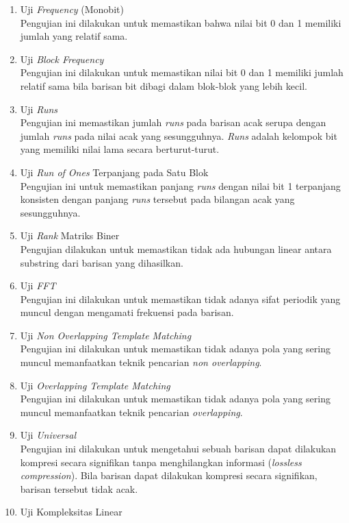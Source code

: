 \begin{enumerate}
  \item Uji \emph{Frequency} (Monobit) \\
  Pengujian ini dilakukan untuk memastikan bahwa nilai bit 0 dan 1 memiliki jumlah yang relatif sama.
  \item Uji \emph{Block Frequency} \\
  Pengujian ini dilakukan untuk memastikan nilai bit 0 dan 1 memiliki jumlah relatif sama bila barisan bit dibagi dalam blok-blok yang lebih kecil.
  \item Uji \emph{Runs} \\
  Pengujian ini memastikan jumlah \emph{runs} pada barisan acak serupa dengan jumlah \emph{runs} pada nilai acak yang sesungguhnya. \emph{Runs} adalah kelompok bit yang memiliki nilai lama secara berturut-turut.
  \item Uji \emph{Run of Ones} Terpanjang pada Satu Blok \\
  Pengujian ini untuk memastikan panjang \emph{runs} dengan nilai bit 1 terpanjang konsisten dengan panjang \emph{runs} tersebut pada bilangan acak yang sesungguhnya.
  \item Uji \emph{Rank} Matriks Biner \\
  Pengujian dilakukan untuk memastikan tidak ada hubungan linear antara substring dari barisan yang dihasilkan.
  \item Uji \emph{FFT} \\
  Pengujian ini dilakukan untuk memastikan tidak adanya sifat periodik yang muncul dengan mengamati frekuensi pada barisan.
  \item Uji \emph{Non Overlapping Template Matching} \\
  Pengujian ini dilakukan untuk memastikan tidak adanya pola yang sering muncul memanfaatkan teknik pencarian \emph{non overlapping}.
  \item Uji \emph{Overlapping Template Matching} \\
  Pengujian ini dilakukan untuk memastikan tidak adanya pola yang sering muncul memanfaatkan teknik pencarian \emph{overlapping}.
  \item Uji \emph{Universal} \\
  Pengujian ini dilakukan untuk mengetahui sebuah barisan dapat dilakukan kompresi secara signifikan tanpa menghilangkan informasi (\emph{lossless compression}). Bila barisan dapat dilakukan kompresi secara signifikan, barisan tersebut tidak acak.
  \item Uji Kompleksitas Linear \\

\end{enumerate}
